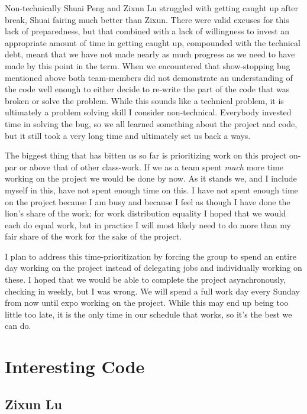 Non-technically Shuai Peng and Zixun Lu struggled with getting caught up after break, Shuai fairing much better than Zixun.
There were valid excuses for this lack of preparedness, but that combined with a lack of willingness to invest an appropriate amount of time in getting caught up, compounded with the technical debt, meant that we have not made nearly as much progress as we need to have made by this point in the term.
When we encountered that show-stopping bug mentioned above both team-members did not demonstrate an understanding of the code well enough to either decide to re-write the part of the code that was broken or solve the problem.
While this sounds like a technical problem, it is ultimately a problem solving skill I consider non-technical.
Everybody invested time in solving the bug, so we all learned something about the project and code, but it still took a very long time and ultimately set us back a ways.

The biggest thing that has bitten us so far is prioritizing work on this project on-par or above that of other class-work.
If we as a team spent \textit{much} more time working on the project we would be done by now.
As it stands we, and I include myself in this, have not spent enough time on this.
I have not spent enough time on the project because I am busy and because I feel as though I have done the lion's share of the work; for work distribution equality I hoped that we would each do equal work, but in practice I will most likely need to do more than my fair share of the work for the sake of the project.

I plan to address this time-prioritization by forcing the group to spend an entire day working on the project instead of delegating jobs and individually working on these.
I hoped that we would be able to complete the project asynchronously, checking in weekly, but I was wrong.
We will spend a full work day every Sunday from now until expo working on the project.
While this may end up being too little too late, it is the only time in our schedule that works, so it's the best we can do.

\section{Interesting Code}

\subsection{Zixun Lu}

